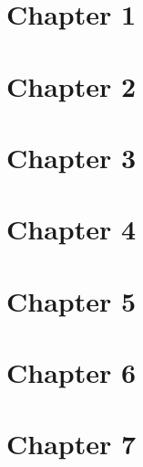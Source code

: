 \documentclass{eeleyes}
\begin{document}
\tableofcontents
\newpage

\section{Chapter 1}


\section{Chapter 2}


\section{Chapter 3}


\section{Chapter 4}


\section{Chapter 5}


\section{Chapter 6}


\section{Chapter 7}

\end{document}
